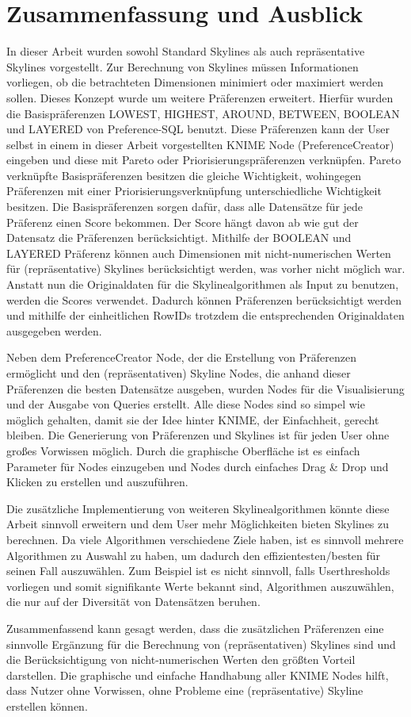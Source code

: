 \chapter{Zusammenfassung und Ausblick}
\label{ch:Zusammenfassung}
In dieser Arbeit wurden sowohl Standard Skylines als auch repräsentative Skylines vorgestellt. Zur Berechnung von Skylines müssen Informationen vorliegen, ob die betrachteten Dimensionen minimiert oder maximiert werden sollen. Dieses Konzept wurde um weitere Präferenzen erweitert. Hierfür wurden die Basispräferenzen LOWEST, HIGHEST, AROUND, BETWEEN, BOOLEAN und LAYERED von Preference-SQL benutzt. 
Diese Präferenzen kann der User selbst in einem in dieser Arbeit vorgestellten KNIME Node (PreferenceCreator) eingeben und diese mit Pareto oder Priorisierungspräferenzen verknüpfen. Pareto verknüpfte Basispräferenzen besitzen die gleiche Wichtigkeit, wohingegen Präferenzen mit einer Priorisierungsverknüpfung unterschiedliche Wichtigkeit besitzen. Die Basispräferenzen sorgen dafür, dass alle Datensätze für jede Präferenz einen Score bekommen. Der Score hängt davon ab wie gut der Datensatz die Präferenzen berücksichtigt. 
Mithilfe der BOOLEAN und LAYERED Präferenz können auch Dimensionen mit nicht-numerischen Werten für (repräsentative) Skylines berücksichtigt werden, was vorher nicht möglich war.  
Anstatt nun die Originaldaten für die Skylinealgorithmen als Input zu benutzen, werden die Scores verwendet. Dadurch können Präferenzen berücksichtigt werden und mithilfe der einheitlichen RowIDs trotzdem die entsprechenden Originaldaten ausgegeben werden. 

Neben dem PreferenceCreator Node, der die Erstellung von Präferenzen ermöglicht und den (repräsentativen) Skyline Nodes, die anhand dieser Präferenzen die besten Datensätze ausgeben, wurden Nodes für die Visualisierung und der Ausgabe von Queries erstellt. Alle diese Nodes sind so simpel wie möglich gehalten, damit sie der Idee hinter KNIME, der Einfachheit, gerecht bleiben. Die Generierung von Präferenzen und Skylines ist für jeden User ohne großes Vorwissen möglich. Durch die graphische Oberfläche ist es einfach Parameter für Nodes einzugeben und Nodes durch einfaches Drag \& Drop und Klicken zu erstellen und auszuführen.  

Die zusätzliche Implementierung von weiteren Skylinealgorithmen könnte diese Arbeit sinnvoll erweitern und dem User mehr Möglichkeiten bieten Skylines zu berechnen. Da viele Algorithmen verschiedene Ziele haben, ist es sinnvoll mehrere Algorithmen zu Auswahl zu haben, um dadurch den effizientesten/besten für seinen Fall auszuwählen. Zum Beispiel ist es nicht sinnvoll, falls Userthresholds vorliegen und somit signifikante Werte bekannt sind, Algorithmen auszuwählen, die nur auf der Diversität von Datensätzen beruhen. 

Zusammenfassend kann gesagt werden, dass die zusätzlichen Präferenzen eine sinnvolle Ergänzung für die Berechnung von (repräsentativen) Skylines sind und die Berücksichtigung von nicht-numerischen Werten den größten Vorteil darstellen. Die graphische und einfache Handhabung aller KNIME Nodes hilft, dass Nutzer ohne Vorwissen, ohne Probleme eine (repräsentative) Skyline erstellen können. 
